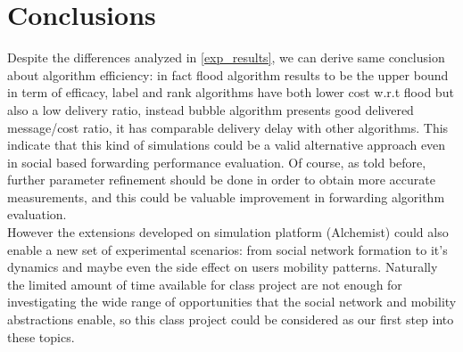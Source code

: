 \section{Conclusions}
\label{conclusions}

Despite the differences analyzed in \ref{exp_results}, we can derive same conclusion about algorithm efficiency: in fact flood algorithm results to be the upper bound in term of efficacy, label and rank algorithms have both lower cost w.r.t flood but also a low delivery ratio, instead bubble algorithm presents good delivered message/cost ratio, it has comparable delivery delay with other algorithms. This indicate that this kind of simulations could be a valid alternative approach even in social based forwarding performance evaluation. Of course, as told before, further parameter refinement should be done in order to obtain more accurate measurements, and this could be valuable improvement in forwarding algorithm evaluation.\\
However the extensions developed on simulation platform (Alchemist) could also enable a new set of experimental scenarios: from social network formation to it's dynamics and maybe even the side effect on users mobility patterns. Naturally the limited amount of time available for class project are not enough for investigating the wide range of opportunities that the social network and mobility abstractions enable, so this class project could be considered as our first step into these topics.  

